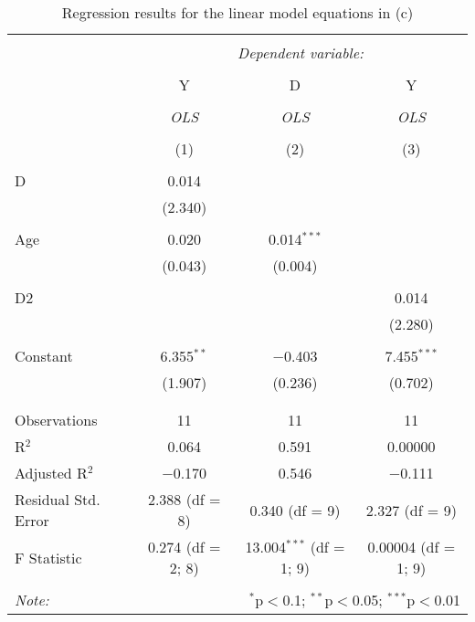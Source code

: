 
\begin{table}[!htbp] \centering 
  \caption{Regression results for the linear model equations in (c)} 
  \label{} 
\begin{tabular}{@{\extracolsep{5pt}}lccc} 
\\[-1.8ex]\hline 
\hline \\[-1.8ex] 
 & \multicolumn{3}{c}{\textit{Dependent variable:}} \\ 
\cline{2-4} 
\\[-1.8ex] & Y & D & Y \\ 
\\[-1.8ex] & \textit{OLS} & \textit{OLS} & \textit{OLS} \\ 
\\[-1.8ex] & (1) & (2) & (3)\\ 
\hline \\[-1.8ex] 
 D & 0.014 &  &  \\ 
  & (2.340) &  &  \\ 
  & & & \\ 
 Age & 0.020 & 0.014$^{***}$ &  \\ 
  & (0.043) & (0.004) &  \\ 
  & & & \\ 
 D2 &  &  & 0.014 \\ 
  &  &  & (2.280) \\ 
  & & & \\ 
 Constant & 6.355$^{**}$ & $-$0.403 & 7.455$^{***}$ \\ 
  & (1.907) & (0.236) & (0.702) \\ 
  & & & \\ 
\hline \\[-1.8ex] 
Observations & 11 & 11 & 11 \\ 
R$^{2}$ & 0.064 & 0.591 & 0.00000 \\ 
Adjusted R$^{2}$ & $-$0.170 & 0.546 & $-$0.111 \\ 
Residual Std. Error & 2.388 (df = 8) & 0.340 (df = 9) & 2.327 (df = 9) \\ 
F Statistic & 0.274 (df = 2; 8) & 13.004$^{***}$ (df = 1; 9) & 0.00004 (df = 1; 9) \\ 
\hline 
\hline \\[-1.8ex] 
\textit{Note:}  & \multicolumn{3}{r}{$^{*}$p$<$0.1; $^{**}$p$<$0.05; $^{***}$p$<$0.01} \\ 
\end{tabular} 
\end{table} 
